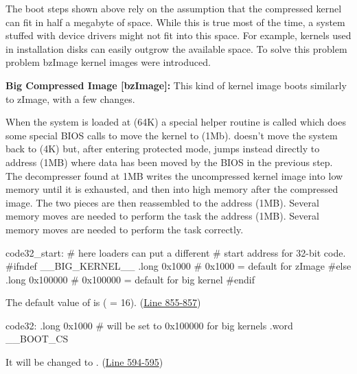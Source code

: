 \begin{itemize}
\begin{enumerate}
\begin{description}
      The boot steps shown above rely on the assumption that the compressed kernel can fit
      in half a megabyte of space. While this is true most of the time, a system stuffed
      with device drivers might not fit into this space. For example, kernels used in
      installation disks can easily outgrow the available space. To solve this problem
      problem bzImage kernel images were introduced.

      \textbf{Big Compressed Image [bzImage]:} This kind of kernel image boots similarly
      to zImage, with a few changes.

      When the system is loaded at  (64K) a special helper routine is called
      which does some special BIOS calls to move the kernel to 
      (1Mb).  doesn’t move the system back to  (4K) but, after
      entering protected mode, jumps instead directly to address  (1MB) where data
      has been moved by the BIOS in the previous step.  The decompresser found at 1MB
      writes the uncompressed kernel image into low memory until it is exhausted, and then
      into high memory after the compressed image.  The two pieces are then reassembled to
      the address  (1MB). Several memory moves are needed to perform the task
      the address  (1MB). Several memory moves are needed to perform the task
      correctly.
    \end{description}
    
    \begin{gascode}
      code32_start:               # here loaders can put a different
                                  # start address for 32-bit code.
      #ifndef __BIG_KERNEL__
              .long     0x1000    #   0x1000 = default for zImage
      #else
              .long     0x100000  # 0x100000 = default for big kernel
      #endif
    \end{gascode}
    \clearpage
    The default value of  is  (
    = 16). (\href{http://lxr.linux.no/linux+v2.6.11/arch/i386/boot/setup.S#L855}{Line
      855-857})
    
    \begin{gascode}
      code32: .long 0x1000    # will be set to 0x100000 for big kernels
      .word __BOOT_CS
    \end{gascode}

    It will be changed to
    . (\href{http://lxr.linux.no/linux+v2.6.11/arch/i386/boot/setup.S#L594}{Line
      594-595})
    

\end{enumerate}
\end{itemize}
